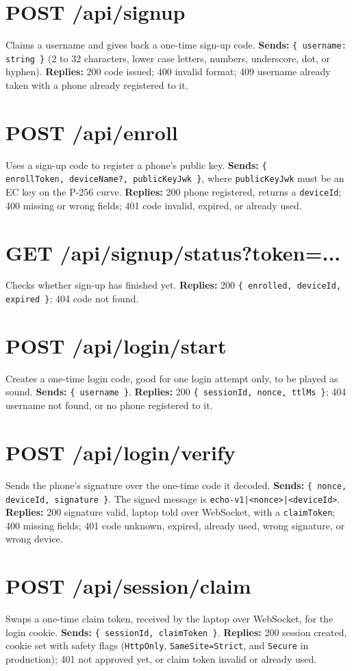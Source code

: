 \section*{POST /api/signup}
Claims a username and gives back a one-time sign-up code.
\textbf{Sends:} \texttt{\{ username: string \}} (2 to 32 characters, lower
case letters, numbers, underscore, dot, or hyphen).
\textbf{Replies:} 200 code issued; 400 invalid format; 409 username
already taken with a phone already registered to it.

\section*{POST /api/enroll}
Uses a sign-up code to register a phone's public key.
\textbf{Sends:} \texttt{\{ enrollToken,\allowbreak\ deviceName?,\allowbreak\ publicKeyJwk \}},
where \texttt{publicKeyJwk} must be an EC key on the P-256 curve.
\textbf{Replies:} 200 phone registered, returns a \texttt{deviceId}; 400
missing or wrong fields; 401 code invalid, expired, or already used.

\section*{GET /api/signup/status?token=...}
Checks whether sign-up has finished yet.
\textbf{Replies:} 200 \texttt{\{ enrolled, deviceId, expired \}}; 404 code
not found.

\section*{POST /api/login/start}
Creates a one-time login code, good for one login attempt only, to be
played as sound.
\textbf{Sends:} \texttt{\{ username \}}.
\textbf{Replies:} 200 \texttt{\{ sessionId, nonce, ttlMs \}}; 404 username
not found, or no phone registered to it.

\section*{POST /api/login/verify}
Sends the phone's signature over the one-time code it decoded.
\textbf{Sends:} \texttt{\{ nonce, deviceId, signature \}}. The signed
message is \texttt{echo-v1|\allowbreak<nonce>|\allowbreak<deviceId>}.
\textbf{Replies:} 200 signature valid, laptop told over WebSocket, with a
\texttt{claimToken}; 400 missing fields; 401 code unknown, expired,
already used, wrong signature, or wrong device.

\section*{POST /api/session/claim}
Swaps a one-time claim token, received by the laptop over WebSocket, for
the login cookie.
\textbf{Sends:} \texttt{\{ sessionId, claimToken \}}.
\textbf{Replies:} 200 session created, cookie set with safety flags
(\texttt{HttpOnly}, \texttt{SameSite=Strict}, and \texttt{Secure} in
production); 401 not approved yet, or claim token invalid or already used.

